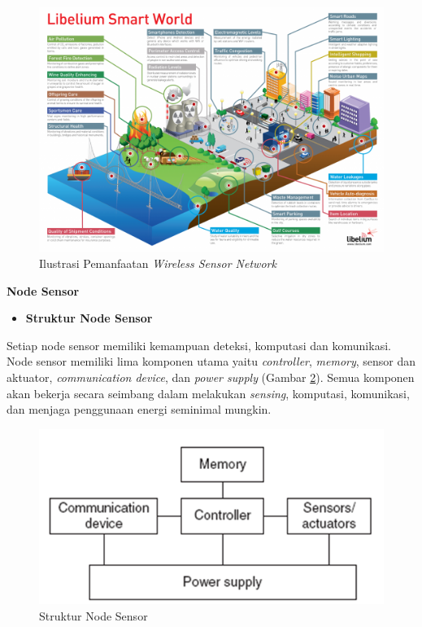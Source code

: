 \documentclass[a4paper,twoside]{article}
\begin{document}
\begin{enumerate}
\begin{figure} [H]
	\centering  
	\includegraphics[scale=0.3]{Gambar/smartworld}  
	\caption[Ilustrasi Pemanfaatan \textit{Wireless Sensor Network}]{Ilustrasi Pemanfaatan \textit{Wireless Sensor Network}} 
	\label{fig:smartworld} 
\end{figure} 

\textbf{Node Sensor}

\begin{itemize}
\item \textbf{Struktur Node Sensor}
\end{itemize}
Setiap node sensor memiliki kemampuan deteksi, komputasi dan komunikasi. Node sensor memiliki lima komponen utama yaitu \textit{controller}, \textit{memory}, sensor dan aktuator, \textit{communication device}, dan \textit{power supply} (Gambar \ref{fig:structure_sensor_node}). Semua komponen akan bekerja secara seimbang dalam melakukan \textit{sensing}, komputasi, komunikasi, dan menjaga penggunaan energi seminimal mungkin. 

\begin{figure} [H]
	\centering  
	\includegraphics[scale=0.3]{Gambar/structure_sensor_node}  
	\caption[Struktur Node Sensor]{Struktur Node Sensor} 
	\label{fig:structure_sensor_node} 
\end{figure}


\end{enumerate}
\end{document}
